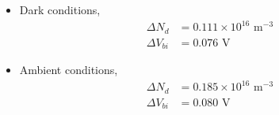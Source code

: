 \begin{itemize}
    \item Dark conditions,
    \begin{align*}
        \Delta N_d &= 0.111 \times 10^{16} \text{ m}^{-3}\\
        \Delta V_{bi} &= 0.076 \text{ V}
    \end{align*}
    \item Ambient conditions,
    \begin{align*}
        \Delta N_d &= 0.185 \times 10^{16} \text{ m}^{-3}\\
        \Delta V_{bi} &= 0.080 \text{ V}
    \end{align*}
\end{itemize}

